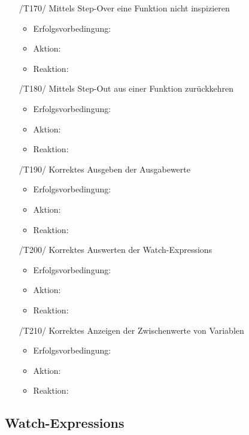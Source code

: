 \documentclass[parskip=full]{scrartcl}
\begin{document}
\begin{itemize}
	\item[/T170/] Mittels \gls{Step-Over} eine Funktion nicht inspizieren
		\begin{itemize}
		\item Erfolgsvorbedingung: 
		\item Aktion:
		\item Reaktion:		
		\end{itemize}	
	
	\item[/T180/] Mittels \gls{Step-Out} aus einer Funktion zurückkehren
		\begin{itemize}
		\item Erfolgsvorbedingung:
		\item Aktion:
		\item Reaktion:		
		\end{itemize}	
	
	\item[/T190/] Korrektes Ausgeben der Ausgabewerte
		\begin{itemize}
		\item Erfolgsvorbedingung:
		\item Aktion:
		\item Reaktion:		
		\end{itemize}	
	
	\item[/T200/] Korrektes Auswerten der \glspl{Watch-Expression}
		\begin{itemize}
		\item Erfolgsvorbedingung:
		\item Aktion:
		\item Reaktion:		
		\end{itemize}	
	
	\item[/T210/] Korrektes Anzeigen der Zwischenwerte von Variablen
		\begin{itemize}
		\item Erfolgsvorbedingung:
		\item Aktion:
		\item Reaktion:		
		\end{itemize}	
	
	
\end{itemize}

\subsection{Watch-Expressions}
\end{document}
